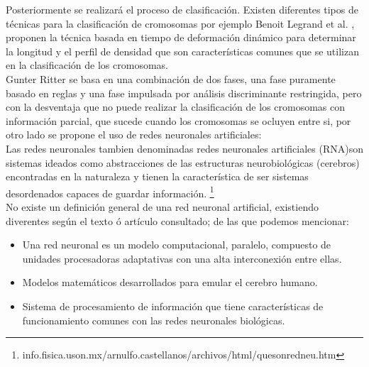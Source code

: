 \documentclass[12pt,letterpaper,titlepage]{article}
\begin{document}
\begin{itemize}
Posteriormente se realizará el proceso de clasificación. Existen diferentes tipos de técnicas para la clasificación de cromosomas por ejemplo Benoit Legrand et al. \cite{132}, proponen la técnica basada en tiempo de deformación dinámico para determinar la longitud y el perfil de densidad que son características comunes que se utilizan en la clasificación de los cromosomas.\\

Gunter Ritter \cite{133} se basa en una combinación de dos fases, una fase puramente basado en reglas y una fase impulsada por análisis discriminante restringida, pero con la desventaja que no puede realizar la clasificación de los cromosomas con información parcial, que sucede cuando los cromosomas se ocluyen entre si, por otro lado se propone el uso de redes neuronales artificiales:\\

Las redes neuronales tambien denominadas redes neuronales artificiales (RNA)son sistemas ideados como abstracciones de las estructuras neurobiológicas (cerebros) encontradas en la naturaleza y tienen la característica de ser sistemas desordenados capaces de guardar información.
 \footnote{info.fisica.uson.mx/arnulfo.castellanos/archivos/html/quesonredneu.htm}\\

No existe un definición general de una red neuronal artificial, existiendo diverentes según el texto ó artículo consultado; de las que podemos mencionar:

\begin{itemize}\itemsep=0pt
\item Una red neuronal es un modelo computacional, paralelo, compuesto de unidades procesadoras adaptativas con una alta interconexión entre ellas.  \cite{126}\\
\item Modelos matemáticos desarrollados para emular el cerebro humano. \cite{127}\\
\item Sistema de procesamiento de información que tiene características de funcionamiento comunes con las redes neuronales biológicas. \cite{128}\\
\end{itemize}



\end{itemize}
\end{document}
